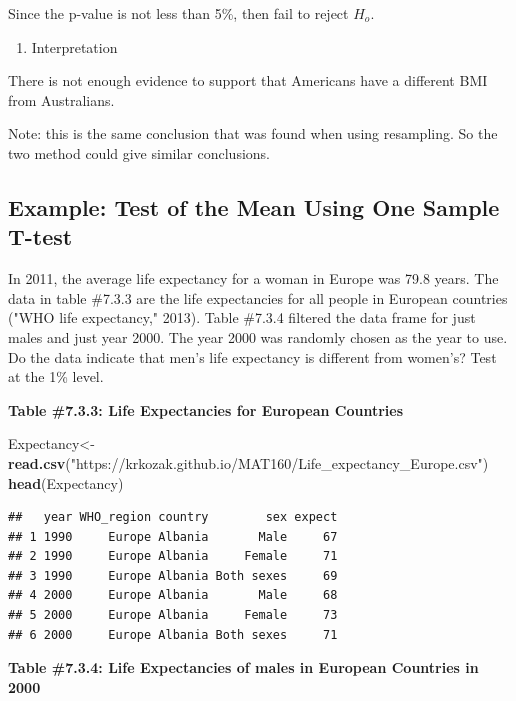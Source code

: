 \documentclass[
]{book}
\newenvironment{Shaded}{\begin{snugshade}}{\end{snugshade}}
\newcommand{\KeywordTok}[1]{\textcolor[rgb]{0.13,0.29,0.53}{\textbf{#1}}}
\newcommand{\NormalTok}[1]{#1}
\newcommand{\StringTok}[1]{\textcolor[rgb]{0.31,0.60,0.02}{#1}}
\providecommand{\tightlist}{%
  \setlength{\itemsep}{0pt}\setlength{\parskip}{0pt}}
\begin{document}
Since the p-value is not less than 5\%, then fail to reject \(H_o\).

\begin{enumerate}
\def\labelenumi{\arabic{enumi}.}
\setcounter{enumi}{5}
\tightlist
\item
  Interpretation
\end{enumerate}

There is not enough evidence to support that Americans have a different BMI from Australians.

Note: this is the same conclusion that was found when using resampling. So the two method could give similar conclusions.

\hypertarget{example-test-of-the-mean-using-one-sample-t-test-1}{%
\subsection{Example: Test of the Mean Using One Sample T-test}\label{example-test-of-the-mean-using-one-sample-t-test-1}}

In 2011, the average life expectancy for a woman in Europe was 79.8 years. The data in table \#7.3.3 are the life expectancies for all people in European countries ("WHO life expectancy," 2013). Table \#7.3.4 filtered the data frame for just males and just year 2000. The year 2000 was randomly chosen as the year to use. Do the data indicate that men's life expectancy is different from women's? Test at the 1\% level.

\textbf{Table \#7.3.3: Life Expectancies for European Countries}

\begin{Shaded}
\begin{Highlighting}[]
\NormalTok{Expectancy<-}\KeywordTok{read.csv}\NormalTok{(}\StringTok{"https://krkozak.github.io/MAT160/Life_expectancy_Europe.csv"}\NormalTok{)}
\KeywordTok{head}\NormalTok{(Expectancy)}
\end{Highlighting}
\end{Shaded}

\begin{verbatim}
##   year WHO_region country        sex expect
## 1 1990     Europe Albania       Male     67
## 2 1990     Europe Albania     Female     71
## 3 1990     Europe Albania Both sexes     69
## 4 2000     Europe Albania       Male     68
## 5 2000     Europe Albania     Female     73
## 6 2000     Europe Albania Both sexes     71
\end{verbatim}

\textbf{Table \#7.3.4: Life Expectancies of males in European Countries in 2000}
\end{document}
